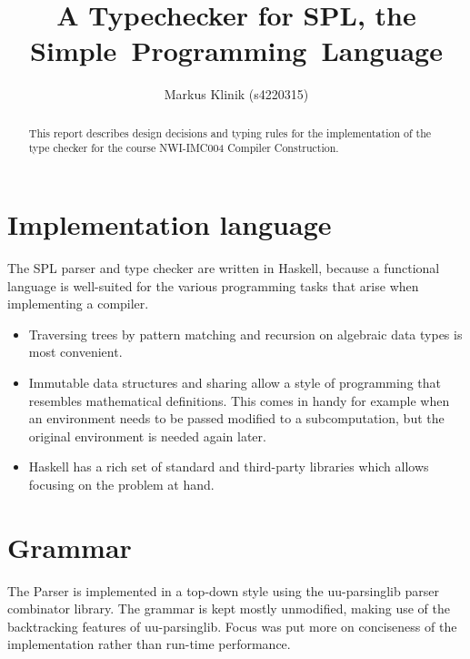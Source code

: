 \documentclass[a4paper]{article}
\begin{document}
\title{A Typechecker for SPL, the Simple~Programming~Language}
\author{Markus Klinik (s4220315)}
\maketitle

\begin{abstract}

This report describes design decisions and typing rules for the
implementation of the type checker for the course NWI-IMC004 Compiler
Construction.

\end{abstract}

\section{Implementation language}

The SPL parser and type checker are written in Haskell, because a
functional language is well-suited for the various programming tasks
that arise when implementing a compiler.

\begin{itemize}

  \item Traversing trees by pattern matching and recursion on algebraic
  data types is most convenient.

  \item Immutable data structures and sharing allow a style of
  programming that resembles mathematical definitions.  This comes in
  handy for example when an environment needs to be passed modified to
  a subcomputation, but the original environment is needed again later.

  \item Haskell has a rich set of standard and third-party libraries
  which allows focusing on the problem at hand.

\end{itemize}

\section{Grammar}

The Parser is implemented in a top-down style using the uu-parsinglib
parser combinator library.  The grammar is kept mostly unmodified,
making use of the backtracking features of uu-parsinglib.  Focus was
put more on conciseness of the implementation rather than run-time
performance.
\end{document}
